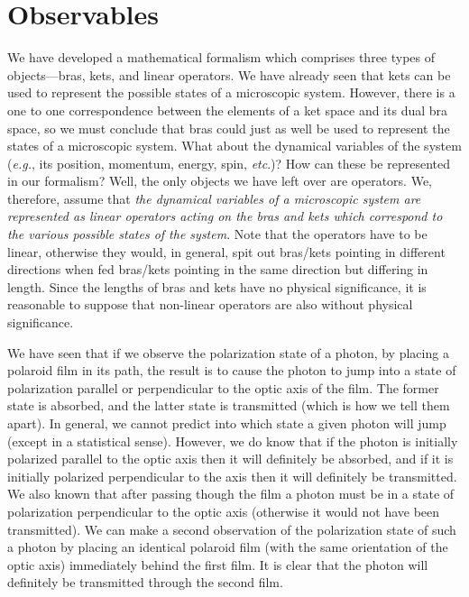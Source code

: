 \section{Observables}
We have developed a mathematical formalism which comprises three types of objects---bras, kets, and linear operators. We have already seen that kets can be used to
represent the possible states of a microscopic system. 
However, there is a one
to one correspondence between the elements of a ket space and its dual bra space,
so we must conclude that bras could just as well be used to represent the states of
a microscopic system. What about the dynamical variables of the  system
({\em e.g.}, its position, momentum, energy, spin, {\em etc}.)? How can these be represented in
our formalism? Well, the only objects we have left over are operators.
We, therefore, assume that {\em the dynamical variables of a microscopic system
are represented as linear operators acting on the bras and kets  which correspond 
to
the various possible states of the system}. Note that the operators have to be linear,
otherwise they would, in general, spit out bras/kets pointing in different directions
when fed bras/kets pointing in the same direction but differing in length. Since the
lengths of bras and kets have no physical significance, it is reasonable to suppose
that non-linear operators are also without physical significance. 

We have seen that if we observe the polarization state of a photon, by
placing a polaroid film in its path, the result is to cause the photon to
jump into a state of polarization parallel or perpendicular to the optic
axis of the film. The former state is absorbed, and the latter state is
transmitted (which is how we tell them apart). In general, we cannot predict
into which state a given photon will jump (except in a statistical sense). 
However, we do know that if the photon is initially polarized parallel to
the optic axis then it will definitely be absorbed, and if it is
initially  polarized
perpendicular to the axis then it will definitely be transmitted. 
We also known that after passing though the film a photon must be 
in a state of polarization perpendicular to the optic axis (otherwise
it would not have been transmitted). We can make a second observation of
the polarization state of such a photon by placing an identical polaroid
film (with the same orientation of the optic axis) immediately behind the
first film. It is clear that the photon will definitely be transmitted
through the second film. 

